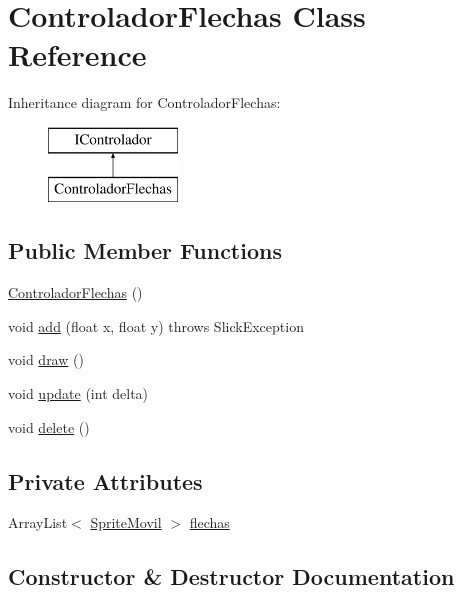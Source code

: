 \hypertarget{class_controlador_flechas}{}\section{Controlador\+Flechas Class Reference}
\label{class_controlador_flechas}
Inheritance diagram for Controlador\+Flechas\+:\begin{figure}[H]
\begin{center}
\leavevmode
\includegraphics[height=2.000000cm]{class_controlador_flechas}
\end{center}
\end{figure}
\subsection*{Public Member Functions}
\begin{DoxyCompactItemize}
\item 
\mbox{\hyperlink{class_controlador_flechas_aa3c0b2e8ba9e7eb027311d29751a575e}{Controlador\+Flechas}} ()
\item 
void \mbox{\hyperlink{class_controlador_flechas_a0f13f2616d99a402e2b5fe2385dd208f}{add}} (float x, float y)  throws Slick\+Exception
\item 
void \mbox{\hyperlink{class_controlador_flechas_a4a4d76786169ef23360cbe57b8c81df2}{draw}} ()
\item 
void \mbox{\hyperlink{class_controlador_flechas_afcc63da58b6dd22715c017593731577e}{update}} (int delta)
\item 
void \mbox{\hyperlink{class_controlador_flechas_abc0b5e9945efd4696c827fecf42503df}{delete}} ()
\end{DoxyCompactItemize}
\subsection*{Private Attributes}
\begin{DoxyCompactItemize}
\item 
Array\+List$<$ \mbox{\hyperlink{class_sprite_movil}{Sprite\+Movil}} $>$ \mbox{\hyperlink{class_controlador_flechas_a1214f7644979b0d063796611a3965201}{flechas}}
\end{DoxyCompactItemize}


\subsection{Constructor \& Destructor Documentation}
\mbox{\label{class_controlador_flechas_aa3c0b2e8ba9e7eb027311d29751a575e}} 
